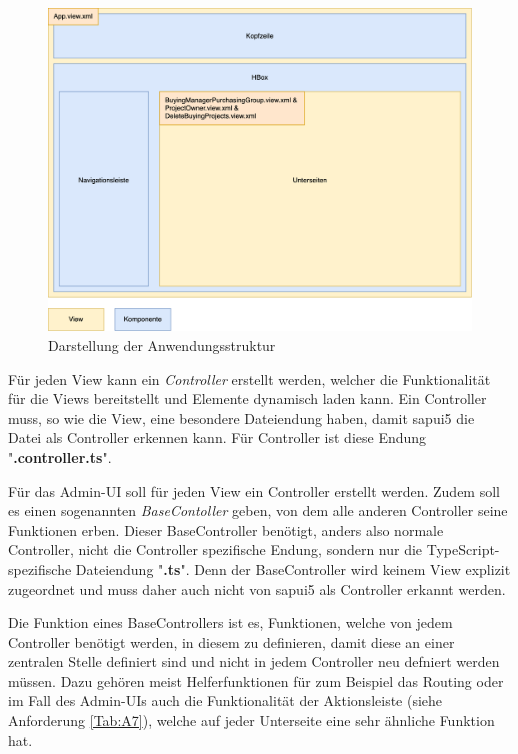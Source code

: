 \begin{figure}[H]
    \centering
    \includegraphics[width=\linewidth]{Images/AppStructure.png}
    \caption[Darstellung der Anwendungsstruktur]{Darstellung der Anwendungsstruktur}
    \label{fig:appstructure}
\end{figure}

Für jeden View kann ein \textit{Controller} erstellt werden, welcher die Funktionalität für die Views bereitstellt und Elemente dynamisch laden kann. 
Ein Controller muss, so wie die View, eine besondere Dateiendung haben, damit \gls{sapui5} die Datei als Controller erkennen kann. Für Controller ist diese Endung "\textbf{.controller.ts}".

Für das Admin-UI soll für jeden View ein Controller erstellt werden. Zudem soll es einen sogenannten \textit{BaseContoller} geben, von dem alle anderen Controller seine Funktionen erben.
Dieser BaseController benötigt, anders also normale Controller, nicht die Controller spezifische Endung, sondern nur die TypeScript-spezifische Dateiendung "\textbf{.ts}".
Denn der BaseController wird keinem View explizit zugeordnet und muss daher auch nicht von \gls{sapui5} als Controller erkannt werden.  

Die Funktion eines BaseControllers ist es, Funktionen, welche von jedem Controller benötigt werden, in diesem zu definieren, damit diese an einer zentralen Stelle definiert sind und nicht in jedem Controller neu defniert werden müssen. 
Dazu gehören meist Helferfunktionen für zum Beispiel das Routing oder im Fall des Admin-UIs auch die Funktionalität der Aktionsleiste (siehe Anforderung \ref{Tab:A7}), welche auf jeder Unterseite eine sehr ähnliche Funktion hat.

